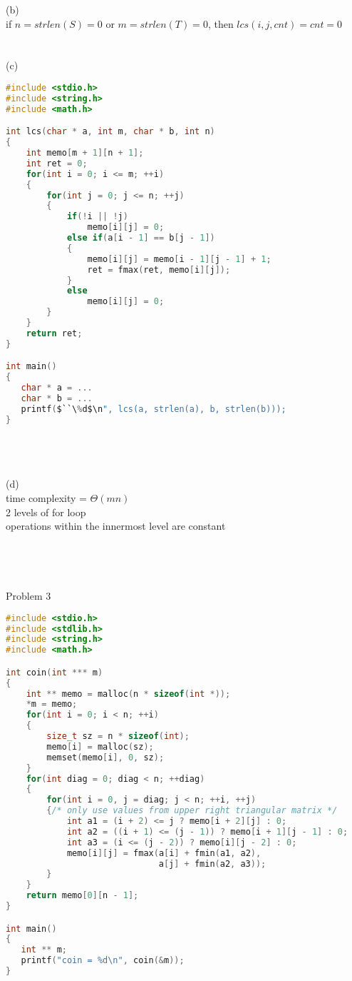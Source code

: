 \documentclass[12pt,border=4pt,multi]{article}%
\begin{document}
\newpage
\noindent
(b)\\
if $n = strlen(S) = 0$ or $m = strlen(T) = 0$, then $lcs(i, j, cnt) = cnt = 0$\\
\\
\\
(c)
\begin{lstlisting}[language = c, mathescape = true, showstringspaces=false]
#include <stdio.h>
#include <string.h>
#include <math.h>

int lcs(char * a, int m, char * b, int n)
{
    int memo[m + 1][n + 1];
    int ret = 0;
    for(int i = 0; i <= m; ++i)
    {
        for(int j = 0; j <= n; ++j)
        {
            if(!i || !j)
                memo[i][j] = 0;
            else if(a[i - 1] == b[j - 1])
            {
                memo[i][j] = memo[i - 1][j - 1] + 1;
                ret = fmax(ret, memo[i][j]);
            }
            else
                memo[i][j] = 0;
        }
    }
    return ret;
}

int main()
{
   char * a = ...
   char * b = ...
   printf($``\%d$\n", lcs(a, strlen(a), b, strlen(b)));
}
\end{lstlisting}
\\
\\
\\
(d)\\
time complexity = $\Theta(mn)$\\
2 levels of for loop\\
operations within the innermost level are constant\\
\\
\\
\\
\\
Problem 3\\
\begin{lstlisting}[language = c]
#include <stdio.h>
#include <stdlib.h>
#include <string.h>
#include <math.h>

int coin(int *** m)
{
    int ** memo = malloc(n * sizeof(int *));
    *m = memo;
    for(int i = 0; i < n; ++i)
    {
        size_t sz = n * sizeof(int);
        memo[i] = malloc(sz);
        memset(memo[i], 0, sz);
    }
    for(int diag = 0; diag < n; ++diag)
    {
        for(int i = 0, j = diag; j < n; ++i, ++j)
        {/* only use values from upper right triangular matrix */
            int a1 = (i + 2) <= j ? memo[i + 2][j] : 0;
            int a2 = ((i + 1) <= (j - 1)) ? memo[i + 1][j - 1] : 0;
            int a3 = (i <= (j - 2)) ? memo[i][j - 2] : 0;
            memo[i][j] = fmax(a[i] + fmin(a1, a2),
                              a[j] + fmin(a2, a3));
        }
    }
    return memo[0][n - 1];
}

int main()
{
   int ** m;
   printf("coin = %d\n", coin(&m));
}
\end{lstlisting}
\end{document}
